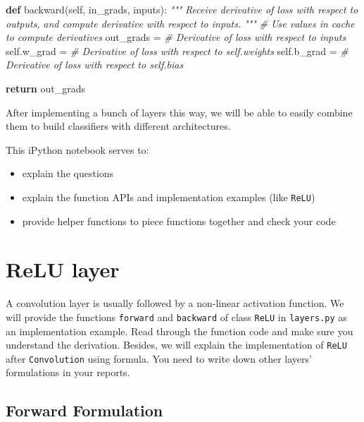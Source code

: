 \documentclass[11pt]{article}
\providecommand{\tightlist}{%
      \setlength{\itemsep}{0pt}\setlength{\parskip}{0pt}}
\newenvironment{Shaded}{}{}
\newcommand{\KeywordTok}[1]{\textcolor[rgb]{0.00,0.44,0.13}{\textbf{{#1}}}}
\newcommand{\CommentTok}[1]{\textcolor[rgb]{0.38,0.63,0.69}{\textit{{#1}}}}
\newcommand{\NormalTok}[1]{{#1}}
\newcommand{\VariableTok}[1]{\textcolor[rgb]{0.10,0.09,0.49}{{#1}}}
\newcommand{\ControlFlowTok}[1]{\textcolor[rgb]{0.00,0.44,0.13}{\textbf{{#1}}}}
\newcommand{\OperatorTok}[1]{\textcolor[rgb]{0.40,0.40,0.40}{{#1}}}
\begin{document}
\begin{Shaded}
\begin{Highlighting}[]
\KeywordTok{def}\NormalTok{ backward(}\VariableTok{self}\NormalTok{, in_grads, inputs):}
  \CommentTok{"""}
\CommentTok{  Receive derivative of loss with respect to outputs,}
\CommentTok{  and compute derivative with respect to inputs.}
\CommentTok{  """}
  \CommentTok{# Use values in cache to compute derivatives}
\NormalTok{  out_grads }\OperatorTok{=} \CommentTok{# Derivative of loss with respect to inputs}
  \VariableTok{self}\NormalTok{.w_grad }\OperatorTok{=} \CommentTok{# Derivative of loss with respect to self.weights}
  \VariableTok{self}\NormalTok{.b_grad }\OperatorTok{=} \CommentTok{# Derivative of loss with respect to self.bias}
    
  \ControlFlowTok{return}\NormalTok{ out_grads}
\end{Highlighting}
\end{Shaded}

After implementing a bunch of layers this way, we will be able to easily
combine them to build classifiers with different architectures.

This iPython notebook serves to:

\begin{itemize}
\tightlist
\item
  explain the questions
\item
  explain the function APIs and implementation examples (like
  \texttt{ReLU})
\item
  provide helper functions to piece functions together and check your
  code
\end{itemize}

    \section{ReLU layer}\label{relu-layer}

A convolution layer is usually followed by a non-linear activation
function. We will provide the functions \texttt{forward} and
\texttt{backward} of class \texttt{ReLU} in \texttt{layers.py} as an
implementation example. Read through the function code and make sure you
understand the derivation. Besides, we will explain the implementation
of \texttt{ReLU} after \texttt{Convolution} using formula. You need to
write down other layers' formulations in your reports.

\subsection{Forward Formulation}\label{forward-formulation}
\end{document}
